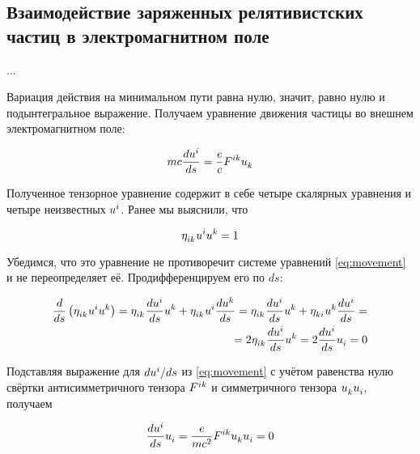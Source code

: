 \documentclass{article}
\begin{document}
\subsection{Взаимодействие заряженных релятивистских частиц в электромагнитном поле}

...

Вариация действия на минимальном пути равна нулю, значит, равно нулю и подынтегральное выражение. Получаем уравнение движения частицы во внешнем электромагнитном поле:

\begin{equation}\label{eq:movement}
    mc\frac{d\tensor{u}{^i}}{ds}=\frac{e}{c}\tensor{F}{^i^k}\tensor{u}{_k}
\end{equation}

Полученное тензорное уравнение содержит в себе четыре скалярных уравнения и четыре неизвестных $\tensor{u}{^i}$. Ранее мы выяснили, что 

\begin{equation}\label{eq:velnorm}
    \tensor{\eta}{_i_k}\tensor{u}{^i}\tensor{u}{^k}=1
\end{equation}

Убедимся, что это уравнение не противоречит системе уравнений \eqref{eq:movement} и не переопределяет её. Продифференцируем его по $ds$:

\begin{equation*}
    \begin{split}
        \frac{d}{ds}\left(\tensor{\eta}{_i_k}\tensor{u}{^i}\tensor{u}{^k}\right)=\tensor{\eta}{_i_k}\frac{d\tensor{u}{^i}}{ds}\tensor{u}{^k}+\tensor{\eta}{_i_k}\tensor{u}{^i}\frac{d\tensor{u}{^k}}{ds}=\tensor{\eta}{_i_k}\frac{d\tensor{u}{^i}}{ds}\tensor{u}{^k}+\tensor{\eta}{_k_i}\tensor{u}{^k}\frac{d\tensor{u}{^i}}{ds}=\\
        =2\tensor{\eta}{_i_k}\frac{d\tensor{u}{^i}}{ds}\tensor{u}{^k}=2\frac{d\tensor{u}{^i}}{ds}\tensor{u}{_i}=0
    \end{split}
\end{equation*}

Подставляя выражение для $d\tensor{u}{^i}/ds$ из \eqref{eq:movement} с учётом равенства нулю свёртки антисимметричного тензора $\tensor{F}{^i^k}$ и симметричного тензора $\tensor{u}{_k}\tensor{u}{_i}$, получаем

\begin{equation*}
    \frac{d\tensor{u}{^i}}{ds}\tensor{u}{_i}=\frac{e}{mc^2}\tensor{F}{^i^k}\tensor{u}{_k}\tensor{u}{_i}=0 
\end{equation*}
\end{document}
